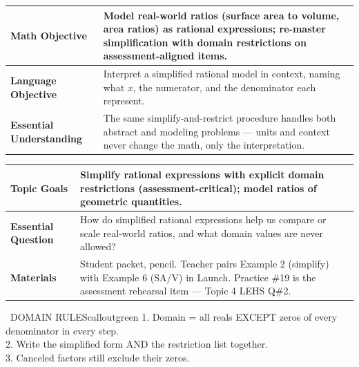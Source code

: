 \documentclass[11pt]{article}
\begin{document}

{\small
\renewcommand{\arraystretch}{1.25}
\noindent\begin{tabular}{|p{1.8in}|p{4.8in}|}
\hline
\textbf{Math Objective} & Model real-world ratios (surface area to volume, area ratios) as rational expressions; re-master simplification with domain restrictions on assessment-aligned items. \\ \hline
\textbf{Language Objective} & Interpret a simplified rational model in context, naming what \(x\), the numerator, and the denominator each represent. \\ \hline
\textbf{Essential Understanding} & The same simplify-and-restrict procedure handles both abstract and modeling problems --- units and context never change the math, only the interpretation. \\ \hline
\end{tabular}
}

{\small
\renewcommand{\arraystretch}{1.25}
\noindent\begin{tabular}{|p{1.8in}|p{4.8in}|}
\hline
\textbf{Topic Goals} & Simplify rational expressions with explicit domain restrictions (assessment-critical); model ratios of geometric quantities. \\ \hline
\textbf{Essential Question} & How do simplified rational expressions help us compare or scale real-world ratios, and what domain values are never allowed? \\ \hline
\textbf{Materials} & Student packet, pencil. Teacher pairs Example 2 (simplify) with Example 6 (SA/V) in Launch. Practice \#19 is the assessment rehearsal item --- Topic 4 LEHS Q\#2. \\ \hline
\end{tabular}
}


\begin{callout}{\IconBook\ DOMAIN RULES}{calloutgreen}
1. Domain = all reals EXCEPT zeros of every denominator in every step.\\
2. Write the simplified form AND the restriction list together.\\
3. Canceled factors still exclude their zeros.
\end{callout}
\end{document}
